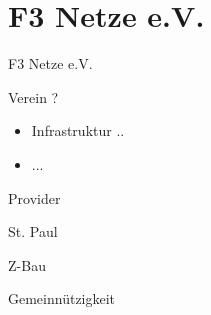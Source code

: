 \section{F3 Netze e.V.}

\begin{frame}{}
    \begin{center}
        F3 Netze e.V.
     \end{center}
\end{frame}

\begin{frame}{Verein ?}
    \begin{itemize}
        \item Infrastruktur ..
        \item ...
    \end{itemize}
\end{frame}

\begin{frame}{Provider}
\end{frame}

\begin{frame}{St. Paul}
\end{frame}

\begin{frame}{Z-Bau}
\end{frame}

\begin{frame}{Gemeinnützigkeit}
\end{frame}

